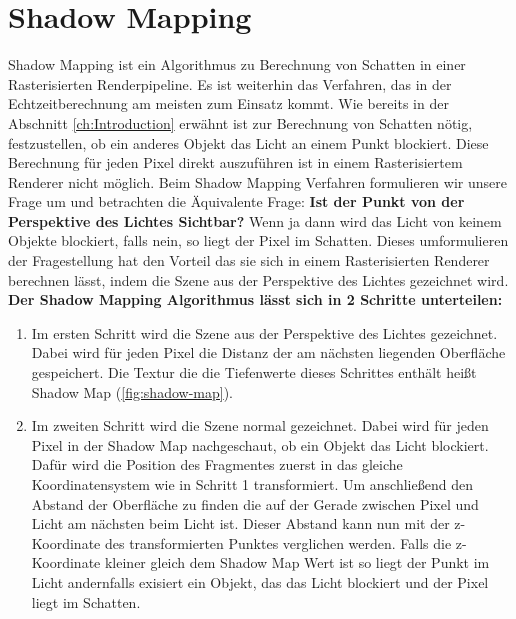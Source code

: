 \chapter{Shadow Mapping} %
\label{section:shadow-mapping}
Shadow Mapping \cite{Williams1978} ist ein Algorithmus zu Berechnung von Schatten 
in einer Rasterisierten Renderpipeline. 
Es ist weiterhin das Verfahren, das in der Echtzeitberechnung am meisten zum Einsatz kommt.
\newline \newline
Wie bereits in der Abschnitt \ref{ch:Introduction} erwähnt ist zur Berechnung von Schatten nötig, festzustellen,
ob ein anderes Objekt das Licht an einem Punkt blockiert.
Diese Berechnung für jeden Pixel direkt auszuführen ist in einem Rasterisiertem 
Renderer nicht möglich.
Beim Shadow Mapping Verfahren formulieren wir unsere Frage um und betrachten 
die Äquivalente Frage:
\textbf{Ist der Punkt von der Perspektive des Lichtes Sichtbar?}
Wenn ja dann wird das Licht von keinem Objekte blockiert,
falls nein, so liegt der Pixel im Schatten.
Dieses umformulieren der Fragestellung hat den Vorteil das sie sich in
einem Rasterisierten Renderer berechnen lässt, indem die Szene aus der Perspektive des Lichtes gezeichnet wird.
\newline
\newline
\textbf{Der Shadow Mapping Algorithmus lässt sich in 2 Schritte 
unterteilen:}
\begin{enumerate}
  \item Im ersten Schritt wird die Szene aus der Perspektive 
    des Lichtes gezeichnet. 
    Dabei wird für jeden Pixel die Distanz der am nächsten liegenden Oberfläche gespeichert.
    Die Textur die die Tiefenwerte dieses Schrittes enthält heißt Shadow Map (\ref{fig:shadow-map}).
  \item Im zweiten Schritt wird die Szene normal gezeichnet.
    Dabei wird für jeden Pixel in der Shadow Map nachgeschaut, ob ein Objekt
    das Licht blockiert.
    Dafür wird die Position des Fragmentes zuerst in das gleiche Koordinatensystem wie in
    Schritt 1 transformiert.
    Um anschließend den Abstand der Oberfläche zu finden die auf der Gerade zwischen Pixel und Licht 
    am nächsten beim Licht ist. 
    Dieser Abstand kann nun mit der z-Koordinate des transformierten Punktes verglichen werden.
    Falls die z-Koordinate kleiner gleich dem Shadow Map Wert ist so liegt der Punkt im Licht andernfalls
    exisiert ein Objekt, das das Licht blockiert und der Pixel liegt im Schatten.
\end{enumerate}
